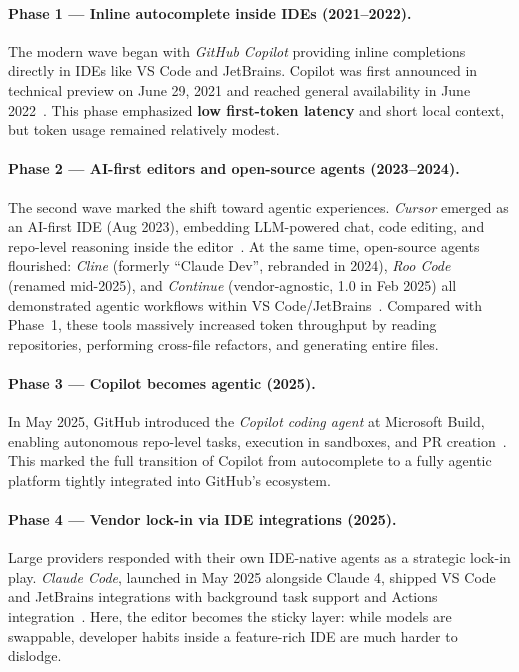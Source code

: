 \documentclass[english]{article}
\begin{document}
\paragraph{Phase 1 — Inline autocomplete inside IDEs (2021–2022).}
The modern wave began with \textit{GitHub Copilot} providing inline completions directly in IDEs like VS Code and JetBrains. 
Copilot was first announced in technical preview on June 29, 2021 and reached general availability in June 2022~\cite{github_copilot_preview,github_copilot_ga}.
This phase emphasized \textbf{low first-token latency} and short local context, but token usage remained relatively modest.

\paragraph{Phase 2 — AI-first editors and open-source agents (2023–2024).}
The second wave marked the shift toward agentic experiences. 
\textit{Cursor} emerged as an AI-first IDE (Aug 2023), embedding LLM-powered chat, code editing, and repo-level reasoning inside the editor~\cite{cursor2023,cursor_latentspace2023}.
At the same time, open-source agents flourished: \textit{Cline} (formerly ``Claude Dev'', rebranded in 2024), \textit{Roo Code} (renamed mid-2025), and \textit{Continue} (vendor-agnostic, 1.0 in Feb 2025) all demonstrated agentic workflows within VS Code/JetBrains~\cite{cline2024,roocode2025,continue2025}.
Compared with Phase~1, these tools massively increased token throughput by reading repositories, performing cross-file refactors, and generating entire files.

\paragraph{Phase 3 — Copilot becomes agentic (2025).}
In May 2025, GitHub introduced the \textit{Copilot coding agent} at Microsoft Build, enabling autonomous repo-level tasks, execution in sandboxes, and PR creation~\cite{github_copilot_agent}.
This marked the full transition of Copilot from autocomplete to a fully agentic platform tightly integrated into GitHub’s ecosystem.

\paragraph{Phase 4 — Vendor lock-in via IDE integrations (2025).}
Large providers responded with their own IDE-native agents as a strategic lock-in play. 
\textit{Claude Code}, launched in May 2025 alongside Claude 4, shipped VS Code and JetBrains integrations with background task support and Actions integration~\cite{claude4_2025,claude_code2025}.
Here, the editor becomes the sticky layer: while models are swappable, developer habits inside a feature-rich IDE are much harder to dislodge.
\end{document}
